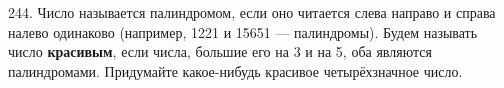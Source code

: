 244. Число называется палиндромом, если оно читается слева направо и справа налево одинаково (например, 1221 и 15651 --- палиндромы). Будем называть число {\bf красивым}, если числа, большие его на 3 и на 5, оба являются палиндромами. Придумайте какое-нибудь красивое четырёхзначное число.\\
